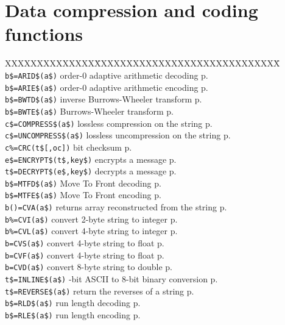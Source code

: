 \section{Data compression and coding functions}
\begin{tabbing}
XXXXXXXXXXXXXX\=XXXXXXXXXXXXXXXXXXXXXXXXXXXXX\=\kill\\
\verb|b$=ARID$(a$)|  	\> order-0 adaptive arithmetic decoding\> p.\pageref{ARIDS}\\
\verb|b$=ARIE$(a$)|  	\> order-0 adaptive arithmetic encoding\> p.\pageref{ARIES}\\
\verb|b$=BWTD$(a$)|  	\>inverse Burrows-Wheeler transform\> p.\pageref{BWTDS}\\
\verb|b$=BWTE$(a$)|  	\>Burrows-Wheeler transform\> p.\pageref{BWTES}\\
\verb|c$=COMPRESS$(a$)|  \>lossless compression on the string\> p.\pageref{COMPRESSS}\\
\verb|c$=UNCOMPRESS$(a$)|  \>lossless uncompression on the string\> p.\pageref{UNCOMPRESSS}\\

\verb|c%=CRC(t$[,oc])|   bit checksum\> p.\pageref{CRC}\\
\verb|e$=ENCRYPT$(t$,key$)|  	\>encrypts a message\> p.\pageref{ENCRYPTS}\\
\verb|t$=DECRYPT$(e$,key$)|  	\>decrypts a message\> p.\pageref{DECRYPTS}\\
\verb|b$=MTFD$(a$)|  	\>Move To Front decoding\> p.\pageref{MTFDS}\\
\verb|b$=MTFE$(a$)|  	\>Move To Front encoding\> p.\pageref{MTFES}\\
\verb|b()=CVA(a$)|  	\> returns array reconstructed from the string\> p.\pageref{CVA}\\
\verb|b%=CVI(a$)|	\> convert 2-byte string to integer\> p.\pageref{CVI}\\
\verb|b%=CVL(a$)|	\> convert 4-byte string to integer\> p.\pageref{CVL}\\
\verb|b=CVS(a$)|	\> convert 4-byte string to float\> p.\pageref{CVS}\\
\verb|b=CVF(a$)|	\> convert 4-byte string to float\> p.\pageref{CVF}\\
\verb|b=CVD(a$)|	\> convert 8-byte string to double\> p.\pageref{CVD}\\

\verb|t$=INLINE$(a$)|  	-bit ASCII to 8-bit binary conversion\> p.\pageref{INLINES}\\
\verb|t$=REVERSE$(a$)| \>  return the reverses of a string\> p.\pageref{REVERSES}\\
\verb|b$=RLD$(a$)|  	\> run length decoding\> p.\pageref{RLDS}\\
\verb|b$=RLE$(a$)|  	\> run length encoding\> p.\pageref{RLES}\\


\end{tabbing}

